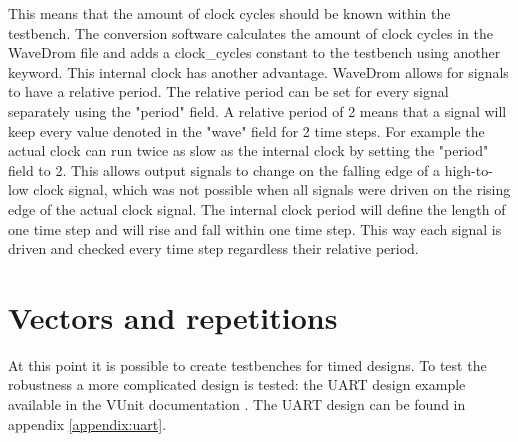 This means that the amount of clock cycles should be known within the testbench. The conversion software calculates the amount of clock cycles in the WaveDrom file and adds a clock\_cycles constant to the testbench using another keyword.
\npar
This internal clock has another advantage. WaveDrom allows for signals to have a relative period. The relative period can be set for every signal separately using the "period" field. A relative period of 2 means that a signal will keep every value denoted in the "wave" field for 2 time steps. For example the actual clock can run twice as slow as the internal clock by setting the "period" field to 2. This allows output signals to change on the falling edge of a high-to-low clock signal, which was not possible when all signals were driven on the rising edge of the actual clock signal. The internal clock period will define the length of one time step and will rise and fall within one time step. This way each signal is driven and checked every time step regardless their relative period.
\section{Vectors and repetitions}
At this point it is possible to create testbenches for timed designs. To test the robustness a more complicated design is tested: the UART design example available in the VUnit documentation \cite{vunit_doc}. The UART design can be found in appendix \ref{appendix:uart}.
